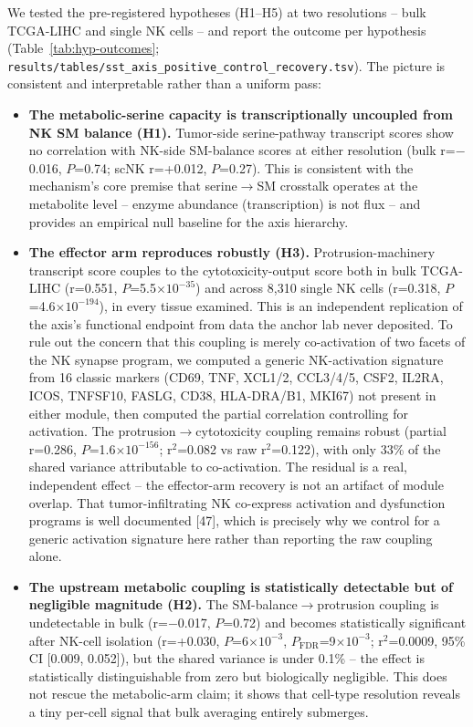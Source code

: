 \documentclass[modern,large,numbered,nocrop]{oup-authoring-template}
\begin{document}
We tested the pre-registered hypotheses (H1--H5) at two resolutions -- bulk TCGA-LIHC and single NK cells -- and report the outcome per hypothesis (Table~\ref{tab:hyp-outcomes}; \texttt{results/tables/sst\_axis\_positive\_control\_recovery.tsv}). The picture is consistent and interpretable rather than a uniform pass:

\begin{itemize}
\item \textbf{The metabolic-serine capacity is transcriptionally uncoupled from NK SM balance (H1).} Tumor-side serine-pathway transcript scores show no correlation with NK-side SM-balance scores at either resolution (bulk r=$-$0.016, $P$=0.74; scNK r=+0.012, $P$=0.27). This is consistent with the mechanism's core premise that serine$\to$SM crosstalk operates at the metabolite level -- enzyme abundance (transcription) is not flux -- and provides an empirical null baseline for the axis hierarchy.
\item \textbf{The effector arm reproduces robustly (H3).} Protrusion-machinery transcript score couples to the cytotoxicity-output score both in bulk TCGA-LIHC (r=0.551, $P$=5.5$\times$$10^{-35}$) and across 8,310 single NK cells (r=0.318, $P$=4.6$\times$$10^{-194}$), in every tissue examined. This is an independent replication of the axis's functional endpoint from data the anchor lab never deposited. To rule out the concern that this coupling is merely co-activation of two facets of the NK synapse program, we computed a generic NK-activation signature from 16 classic markers (CD69, TNF, XCL1/2, CCL3/4/5, CSF2, IL2RA, ICOS, TNFSF10, FASLG, CD38, HLA-DRA/B1, MKI67) not present in either module, then computed the partial correlation controlling for activation. The protrusion$\to$cytotoxicity coupling remains robust (partial r=0.286, $P$=1.6$\times$$10^{-156}$; r$^{2}$=0.082 vs raw r$^{2}$=0.122), with only 33\% of the shared variance attributable to co-activation. The residual is a real, independent effect -- the effector-arm recovery is not an artifact of module overlap. That tumor-infiltrating NK co-express activation and dysfunction programs is well documented [47], which is precisely why we control for a generic activation signature here rather than reporting the raw coupling alone.
\item \textbf{The upstream metabolic coupling is statistically detectable but of negligible magnitude (H2).} The SM-balance$\to$protrusion coupling is undetectable in bulk (r=$-$0.017, $P$=0.72) and becomes statistically significant after NK-cell isolation (r=+0.030, $P$=6$\times$$10^{-3}$, $P_{\mathrm{FDR}}$=9$\times$$10^{-3}$; r$^{2}$=0.0009, 95\% CI [0.009, 0.052]), but the shared variance is under 0.1\% -- the effect is statistically distinguishable from zero but biologically negligible. This does not rescue the metabolic-arm claim; it shows that cell-type resolution reveals a tiny per-cell signal that bulk averaging entirely submerges.
$$
\end{itemize}
\end{document}
